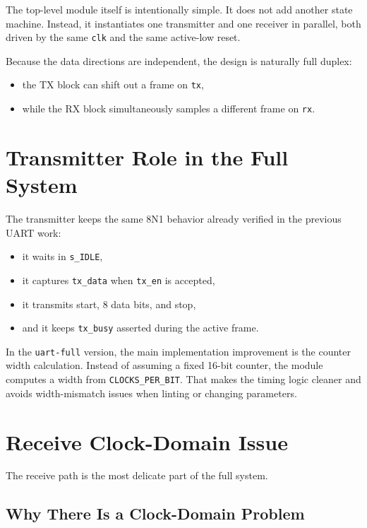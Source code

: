 \documentclass[12pt]{article}
\begin{document}
The top-level module itself is intentionally simple. It does not add another
state machine. Instead, it instantiates one transmitter and one receiver in
parallel, both driven by the same \texttt{clk} and the same active-low reset.

Because the data directions are independent, the design is naturally
full duplex:

\begin{itemize}
    \item the TX block can shift out a frame on \texttt{tx},
    \item while the RX block simultaneously samples a different frame on
    \texttt{rx}.
\end{itemize}

\section{Transmitter Role in the Full System}

The transmitter keeps the same 8N1 behavior already verified in the previous
UART work:

\begin{itemize}
    \item it waits in \texttt{s\_IDLE},
    \item it captures \texttt{tx\_data} when \texttt{tx\_en} is accepted,
    \item it transmits start, 8 data bits, and stop,
    \item and it keeps \texttt{tx\_busy} asserted during the active frame.
\end{itemize}

In the \texttt{uart-full} version, the main implementation improvement is the
counter width calculation. Instead of assuming a fixed 16-bit counter, the module
computes a width from \texttt{CLOCKS\_PER\_BIT}. That makes the timing logic
cleaner and avoids width-mismatch issues when linting or changing parameters.

\section{Receive Clock-Domain Issue}

The receive path is the most delicate part of the full system.

\subsection*{Why There Is a Clock-Domain Problem}
\end{document}
